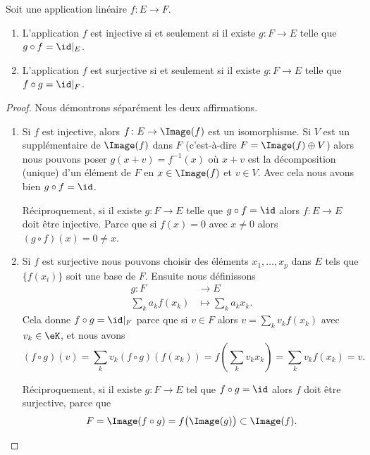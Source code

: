 \begin{lemma}        \label{LEMooDAACooElDsYb}
	Soit une application linéaire \( f\colon E\to F\).
	\begin{enumerate}
		\item       \label{ITEMooEZEWooZGoqsZ}
		      L'application \( f\) est injective si et seulement si il existe \( g\colon F\to E\) telle que \( g\circ f=\id|_E\).
		\item
		      L'application \( f\) est surjective si et seulement si il existe \( g\colon F\to E\) telle que \( f\circ g=\id|_F\).
	\end{enumerate}
\end{lemma}

\begin{proof}
	Nous démontrons séparément les deux affirmations.
	\begin{enumerate}
		\item
		      Si \( f\) est injective, alors \( f\colon E\to \Image(f)\) est un isomorphisme. Si \( V\) est un supplémentaire de \( \Image(f)\) dans \( F\) (c'est-à-dire \( F=\Image(f)\oplus V\)) alors nous pouvons poser \( g(x+v)=f^{-1}(x)\) où \( x+v\) est la décomposition (unique) d'un élément de \( F\) en \( x\in\Image(f)\) et \( v\in V\). Avec cela nous avons bien \( g\circ f=\id\).

		      Réciproquement, si il existe \( g\colon F\to E\) telle que \( g\circ f=\id\) alors \( f\colon E\to E\) doit être injective. Parce que si \( f(x)=0\) avec \( x\neq 0\) alors \( (g\circ f)(x)=0\neq x\).
		\item
		      Si \( f\) est surjective nous pouvons choisir des éléments \( x_1,\ldots, x_p\) dans \( E\) tels que \( \{ f(x_i) \}\) soit une base de \( F\). Ensuite nous définissons
		      \begin{equation}
			      \begin{aligned}
				      g\colon F         & \to E                   \\
				      \sum_k a_k f(x_k) & \mapsto \sum_k a_k x_k.
			      \end{aligned}
		      \end{equation}
		      Cela donne \(  f\circ g=\id|_F\) parce que si \( v\in F\) alors \( v=\sum_kv_kf(x_k)\) avec \( v_k\in \eK\), et nous avons
		      \begin{equation}
			      (f\circ g)(v)=\sum_k v_k (f\circ g) \left(f(x_k)\right)
			      =f\left( \sum_k v_k x_k \right)
			      =\sum_k v_k f(x_k) = v.
		      \end{equation}

		      Réciproquement, si il existe \( g\colon F\to E\) tel que \( f\circ g=\id\) alors \( f\) doit être surjective, parce que
		      \begin{equation}
			      F=\Image(f\circ g)=f\big( \Image(g) \big)\subset \Image(f).
		      \end{equation}
	\end{enumerate}
\end{proof}
